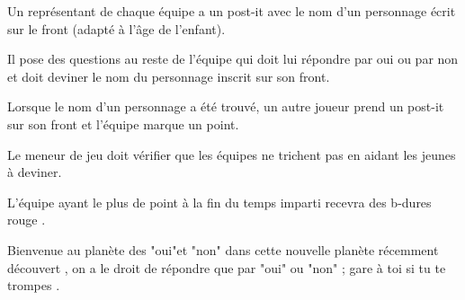 \documentclass{grand-jeu}
\begin{document}
\begin{liste-materiel}
\end{liste-materiel}

\begin{regles}
Un représentant de chaque équipe a un post-it avec le nom d'un personnage écrit sur le front (adapté à l'âge de l'enfant).

Il pose des questions au reste de l'équipe qui doit lui répondre par oui ou par non et doit deviner le nom du personnage inscrit sur son front.

Lorsque le nom d'un personnage a été trouvé, un autre joueur prend un post-it sur son front et l'équipe marque un point.

Le meneur de jeu doit vérifier que les équipes ne trichent pas en aidant les jeunes à deviner.

L’équipe ayant le plus de point à la fin du temps imparti recevra des b-dures rouge .
\end{regles}

\begin{imaginaire}
Bienvenue au planète des "oui"et "non" dans cette nouvelle planète récemment découvert , on a le droit de répondre que par "oui" ou "non" ; gare à toi si tu te trompes .

\end{imaginaire}

\begin{moments-stop}
\end{moments-stop}
\end{document}
